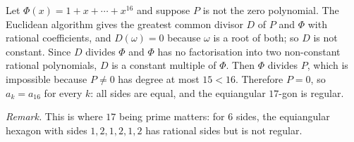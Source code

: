 Let $\Phi(x)=1+x+\cdots+x^{16}$ and suppose $P$ is not the zero polynomial. The Euclidean algorithm gives the greatest common divisor $D$ of $P$ and $\Phi$ with rational coefficients, and $D(\omega)=0$ because $\omega$ is a root of both; so $D$ is not constant. Since $D$ divides $\Phi$ and $\Phi$ has no factorisation into two non-constant rational polynomials, $D$ is a constant multiple of $\Phi$. Then $\Phi$ divides $P$, which is impossible because $P\ne0$ has degree at most $15<16$. Therefore $P=0$, so $a_k=a_{16}$ for every $k$: all sides are equal, and the equiangular $17$-gon is regular.

\emph{Remark.} This is where $17$ being prime matters: for $6$ sides, the equiangular hexagon with sides $1,2,1,2,1,2$ has rational sides but is not regular.
